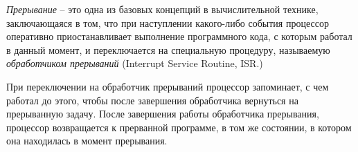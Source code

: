 \documentclass[../sparc.tex]{subfiles}
\begin{document}

\emph{Прерывание} -- это одна из базовых концепций в вычислительной технике,
заключающаяся в том, что при наступлении какого-либо события процессор
оперативно приостанавливает выполнение программного кода, с которым работал в
данный момент, и переключается на специальную процедуру, называемую
\emph{обработчиком прерываний} (Interrupt Service Routine, ISR.)

При переключении на обработчик прерываний процессор запоминает, с чем работал до
этого, чтобы после завершения обработчика вернуться на прерыванную задачу.
После завершения работы обработчика прерывания, процессор возвращается к
прерванной программе, в том же состоянии, в котором она находилась в момент
прерывания.\cite[452-456]{tanenbaum2021-ru}
\end{document}

